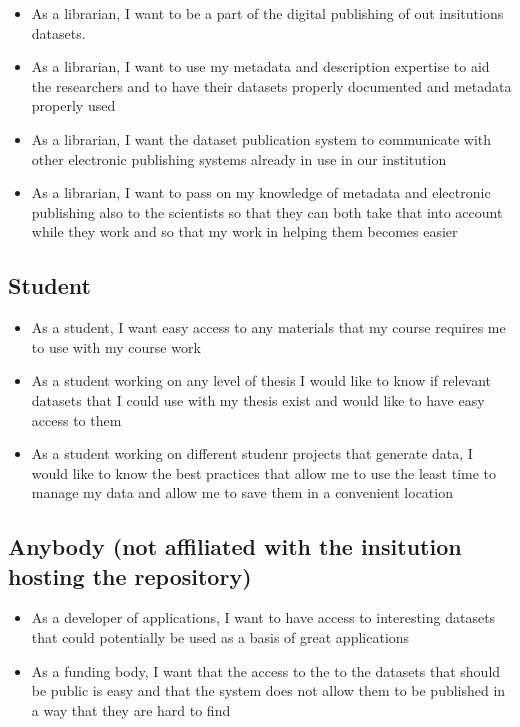 \begin{itemize}
    \item As a librarian, I want to be a part of the digital publishing of out
          insitutions datasets.
    \item As a librarian, I want to use my metadata and description expertise
          to aid the researchers and to have their datasets properly documented
          and metadata properly used
    \item As a librarian, I want the dataset publication system to communicate
          with other electronic publishing systems already in use in our
          institution
    \item As a librarian, I want to pass on my knowledge of metadata and
          electronic publishing also to the scientists so that they can both
          take that into account while they work and so that my work in helping
          them becomes easier
\end{itemize}

\subsection{Student}

\begin{itemize}
    \item As a student, I want easy access to any materials that my course
          requires me to use with my course work
    \item As a student working on any level of thesis I would like to know if
          relevant datasets that I could use with my thesis exist and would
          like to have easy access to them
    \item As a student working on different studenr projects that generate
          data, I would like to know the best practices that allow me to use
          the least time to manage my data and allow me to save them in a
          convenient location
\end{itemize}

\subsection{Anybody (not affiliated with the insitution hosting the repository)}

\begin{itemize}
    \item As a developer of applications, I want to have access to interesting
          datasets that could potentially be used as a basis of great
          applications
    \item As a funding body, I want that the access to the to the datasets that
          should be public is easy and that the system does not allow them to
          be published in a way that they are hard to find
\end{itemize}

